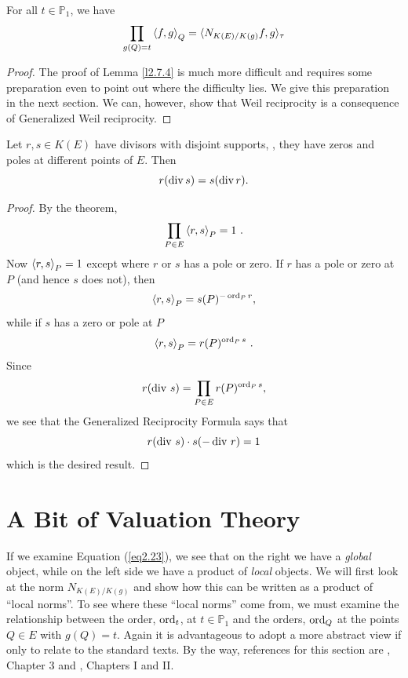 \begin{lem}
\label{l2.7.4}
For all $t \in \mathbb{P}_{1}$, we have
\begin{equation}
\label{eq2.23}
\prod_{g(Q)=t}\left\langle f,g \right \rangle_{Q}=\langle N_{K(E)/K(g)}f,g\rangle_{\tau}
\end{equation}
\end{lem}

\begin{proof}
The proof of Lemma \ref{l2.7.4} is much more difficult and requires some preparation even to point out where the difficulty lies. We give this preparation in the next section. We can, however, show that Weil reciprocity is a consequence of Generalized Weil reciprocity.
\end{proof}

\begin{coro}
\label{c2.7.6}
Let $r,s\in K(E)$ have divisors with disjoint supports, \ie, they have zeros and poles at different points of $E$. Then
\begin{equation}
r(\operatorname{div}s)=s(\operatorname{div}r) .
\end{equation}
\end{coro}

\begin{proof}
By the theorem,
$$
\prod_{P\in E} \left\langle r, s \right \rangle_{P}=1\ .
$$
Now $\left\langle r, s \right \rangle_{P}=1$ except where $r$ or $s$ has a pole or zero. If $r$ has a pole or zero at $P$ (and hence $s$ does not), then
$$
\left\langle r, s \right \rangle_{P}=s(P)^{-\operatorname{ord}_{P}r},
$$
while if $s$ has a zero or pole at $P$
$$
\left\langle r,s \right \rangle_{P}=r(P)^{\operatorname{ord}_{P}s}\ .
$$
Since
$$
r(\operatorname{div}\, s)=\prod_{P\in E}r(P)^{\operatorname{ord}_{P}s},
$$
we see that the Generalized Reciprocity Formula says that
$$
r(\operatorname{div}\, s)\cdot s(-\operatorname{div}\, r)=1
$$
which is the desired result.
\end{proof}

\section{A Bit of Valuation Theory}
\label{sec2.8}

If we examine Equation (\ref{eq2.23}), we see that on the right we have a {\it global} object, while on the left side we have a product of {\it local} objects. We will first look at the norm $N_{K(E)/K(g)}$ and show how this can be written as a product of ``local norms''. To see where these ``local norms'' come from, we must examine the relationship between the order, $\operatorname{ord}_{t}$, at $t \in \mathbb{P}_{1}$ and the orders, $\operatorname{ord}_{Q}$ at the points $Q\in E$ with $g(Q)=t$. Again it is advantageous to adopt a more abstract view if only to relate to the standard texts. By the way, references for this section are \cite{r2.11}, Chapter 3 and \cite{r2.14}, Chapters I and II.

